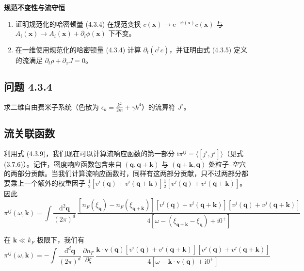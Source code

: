 \textbf{规范不变性与流守恒}
\begin{enumerate}
\item 证明规范化的哈密顿量 (4.3.4) 在规范变换 $c(\pmb{x})\to\mathrm{e}^{-\mathrm{i}\phi(\pmb{x})}c(\pmb{x})$ 与 $A_i(\pmb{x})\to A_i(\pmb{x})+\partial_i\phi(\pmb{x})$ 下不变。
\item 在一维使用规范化的哈密顿量 (4.3.4) 计算 $\partial_t(c^{\dagger}c)$，并证明由式 (4.3.5) 定义的流满足 $\partial_t\rho+\partial_x J=0$。
\end{enumerate}

\subsection*{问题 4.3.4}

求二维自由费米子系统（色散为 $\epsilon_k=\frac{k^2}{2m}+\gamma k^4$）的流算符 $J^i$。

\subsection{流关联函数}

利用式 (4.3.9)，我们现在可以计算流响应函数的第一部分 $\mathrm{i}\pi^{ij}=\langle[j^i,j^j]\rangle$（见式 (3.7.6)）。记住，密度响应函数包含来自 $(\pmb{q},\pmb{q}+\pmb{k})$ 与 $(\pmb{q}+\pmb{k},\pmb{q})$ 处粒子–空穴的两部分贡献。当我们计算流响应函数时，同样有这两部分贡献，只不过两部分都要乘上一个额外的权重因子 $\frac{1}{2}[v^i(\pmb{q})+v^i(\pmb{q}+\pmb{k})]\frac{1}{2}[v^j(\pmb{q})+v^j(\pmb{q}+\pmb{k})]$。因此
\begin{equation*}
\pi^{ij}(\omega,\pmb{k}) = \int \frac{\mathrm{d}^2\pmb{q}}{(2\pi)^d}\, \frac{\left[n_F(\xi_{\pmb{q}})-n_F(\xi_{\pmb{q}+\pmb{k}})\right]\left[v^i(\pmb{q})+v^i(\pmb{q}+\pmb{k})\right]\left[v^j(\pmb{q})+v^j(\pmb{q}+\pmb{k})\right]}{4\left[\omega-(\xi_{\pmb{q}+\pmb{k}}-\xi_{\pmb{q}})+\mathrm{i}0^{+}\right]}
\end{equation*}

在 $\pmb{k}\ll k_F$ 极限下，我们有
\begin{equation*}
\pi^{ij}(\omega,\pmb{k}) = -\int \frac{\mathrm{d}^d\pmb{q}}{(2\pi)^d}\, \frac{\partial n_F}{\partial\xi}\, \frac{\pmb{k}\cdot\pmb{v}(\pmb{q})\left[v^i(\pmb{q})+v^i(\pmb{q}+\pmb{k})\right]\left[v^j(\pmb{q})+v^j(\pmb{q}+\pmb{k})\right]}{4\left[\omega-\pmb{k}\cdot\pmb{v}(\pmb{q})+\mathrm{i}0^{+}\right]}
\end{equation*}

